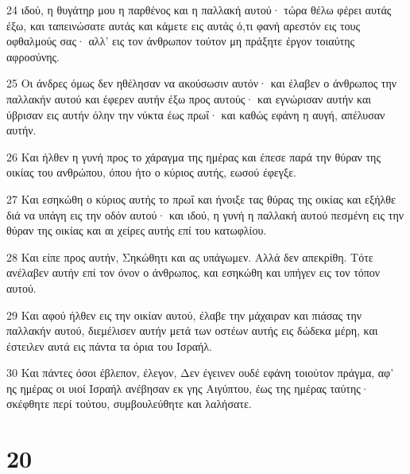 \par 24 ιδού, η θυγάτηρ μου η παρθένος και η παλλακή αυτού· τώρα θέλω φέρει αυτάς έξω, και ταπεινώσατε αυτάς και κάμετε εις αυτάς ό,τι φανή αρεστόν εις τους οφθαλμούς σας· αλλ' εις τον άνθρωπον τούτον μη πράξητε έργον τοιαύτης αφροσύνης.
\par 25 Οι άνδρες όμως δεν ηθέλησαν να ακούσωσιν αυτόν· και έλαβεν ο άνθρωπος την παλλακήν αυτού και έφερεν αυτήν έξω προς αυτούς· και εγνώρισαν αυτήν και ύβρισαν εις αυτήν όλην την νύκτα έως πρωΐ· και καθώς εφάνη η αυγή, απέλυσαν αυτήν.
\par 26 Και ήλθεν η γυνή προς το χάραγμα της ημέρας και έπεσε παρά την θύραν της οικίας του ανθρώπου, όπου ήτο ο κύριος αυτής, εωσού έφεγξε.
\par 27 Και εσηκώθη ο κύριος αυτής το πρωΐ και ήνοιξε τας θύρας της οικίας και εξήλθε διά να υπάγη εις την οδόν αυτού· και ιδού, η γυνή η παλλακή αυτού πεσμένη εις την θύραν της οικίας και αι χείρες αυτής επί του κατωφλίου.
\par 28 Και είπε προς αυτήν, Σηκώθητι και ας υπάγωμεν. Αλλά δεν απεκρίθη. Τότε ανέλαβεν αυτήν επί τον όνον ο άνθρωπος, και εσηκώθη και υπήγεν εις τον τόπον αυτού.
\par 29 Και αφού ήλθεν εις την οικίαν αυτού, έλαβε την μάχαιραν και πιάσας την παλλακήν αυτού, διεμέλισεν αυτήν μετά των οστέων αυτής εις δώδεκα μέρη, και έστειλεν αυτά εις πάντα τα όρια του Ισραήλ.
\par 30 Και πάντες όσοι έβλεπον, έλεγον, Δεν έγεινεν ουδέ εφάνη τοιούτον πράγμα, αφ' ης ημέρας οι υιοί Ισραήλ ανέβησαν εκ γης Αιγύπτου, έως της ημέρας ταύτης· σκέφθητε περί τούτου, συμβουλεύθητε και λαλήσατε.

\chapter{20}

